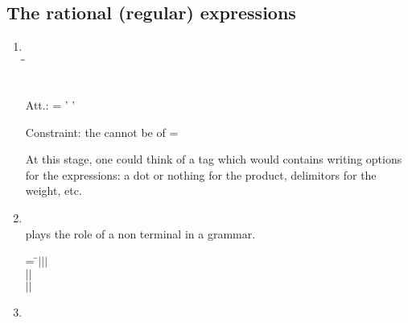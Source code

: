 \newpage 
\subsection{The rational (regular) expressions}

\begin{enumerate}
\addtocounter{enumi}{\value{enumitemp}}

\item {}

\begin{tabbing}
      \\[\taglnskp]
\tagindent{}\tagsp\=\oneocc \=\req\kill
\tagindent{}   \>\oneocc \>\req \\[\taglnskp]
\tagindent{} \>\oneocc \>\req \\[\taglnskp]
\end{tabbing}

\begin{tabbing}
\ptn Att.: = ' ' \tagsp  \strng   \opt
\end{tabbing}

\trt Constraint: the   cannot be of  = 

\trt    At this stage, one could think of a    tag which would contains
    writing options for the expressions: a dot or nothing for the product,
    delimitors for the weight, etc.

\smallskip
\item {}

\begin{tabbing}
      \\[\taglnskp]
\tagindent\BTRE \tagsp  plays the role of a non terminal in a grammar.\\[\taglnskp]
\end{tabbing}

\begin{tabbing}
\BTRE =  \=$|$$|$$|$\\
         \>$|$$|$\\
         \>$|$$|$
\end{tabbing}

\item {}

\begin{tabbing}
\\[\taglnskp]
\tagindent\BTRE\\[\taglnskp]
\tagindent\BTRE\\[\taglnskp]
\end{tabbing}



\end{enumerate}
